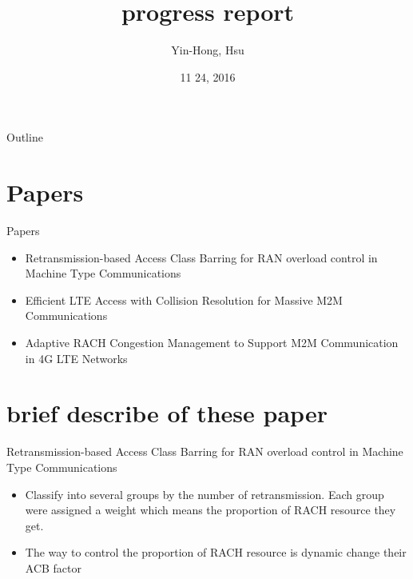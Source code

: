 \documentclass{beamer}
\title {
    progress report 
}
\author {
    Yin-Hong, Hsu
}
\date {
    11 24, 2016
}
\begin{document}
\begin{frame}
    \titlepage
\end{frame}


\begin{frame}{Outline}
    \tableofcontentsgather
    \tableofcontents
\end{frame}

\section{Papers}

\begin{frame} {Papers} 
    \begin{itemize}
        \item {Retransmission-based Access Class Barring for RAN overload control in Machine Type Communications}\cite{RACB}
        \item {Efficient LTE Access with Collision Resolution for Massive M2M Communications} \cite{7063635}
        \item {Adaptive RACH Congestion Management to Support M2M Communication in 4G LTE Networks} \cite{6802879}
    \end{itemize}
\end{frame}

\section{brief describe of these paper}
\begin{frame}{Retransmission-based Access Class Barring for RAN overload control in Machine Type Communications}
    \begin{itemize}
            \item {Classify into several groups by the number of retransmission. Each group were assigned a weight which means the proportion of RACH resource they get.}
            \item {The way to control the proportion of RACH resource is dynamic change their ACB factor}
    \end{itemize}
\end{frame}
\end{document}
